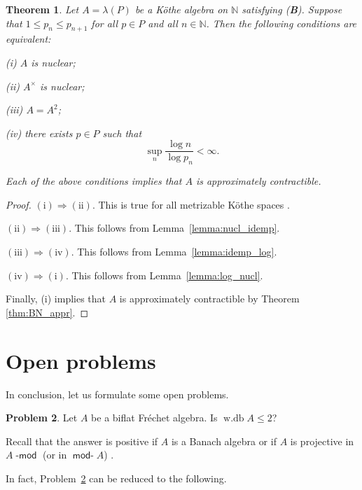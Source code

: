 \documentclass[12pt,reqno]{amsart}
\newtheorem{theorem}{Theorem}[section]
\theoremstyle{definition}
\newtheorem{problem}[theorem]{Problem}
\begin{document}
\begin{theorem}
\label{thm:idemp_appr}
Let $A=\lambda(P)$ be a K\"othe algebra on ${\mathbb N}$ satisfying {\upshape ({\textbf{B}})}.
Suppose that $1\le p_n\le p_{n+1}$ for all $p\in P$ and all $n\in{\mathbb N}$.
Then the following conditions are equivalent:
\begin{compactenum}
\item[{\upshape (i)}] $A$ is nuclear;
\item[{\upshape (ii)}] $A^\times$ is nuclear;
\item[{\upshape (iii)}] $A=A^2$;
\item[{\upshape (iv)}] there exists $p\in P$ such that
\[
\sup_n \frac{\log n}{\log p_n}<\infty.
\]
\end{compactenum}
Each of the above conditions implies that $A$ is approximately contractible.
\end{theorem}
\begin{proof}
$\mathrm{(i)}\Longrightarrow\mathrm{(ii)}$.
This is true for all metrizable K\"othe spaces \cite[Satz 7]{Kothe_nucl}.

$\mathrm{(ii)}\Longrightarrow\mathrm{(iii)}$. This follows from
Lemma~\ref{lemma:nucl_idemp}.

$\mathrm{(iii)}\Longrightarrow\mathrm{(iv)}$. This follows from
Lemma~\ref{lemma:idemp_log}.

$\mathrm{(iv)}\Longrightarrow\mathrm{(i)}$. This follows from
Lemma~\ref{lemma:log_nucl}.

Finally, (i) implies that $A$ is approximately contractible by Theorem \ref{thm:BN_appr}.
\end{proof}

\section{Open problems}
In conclusion, let us formulate some open problems.

\begin{problem}
\label{probl:bifl_wdb}
Let $A$ be a biflat Fr\'echet algebra. Is ${\mathop{\mathrm{w.db}}} A\le 2$?
\end{problem}

Recall that the answer is positive if $A$ is a Banach algebra
\cite[2.5.8]{X_HOA} or if $A$ is projective in $A{\mbox{-}\!\mathop{\mathsf{mod}}}$ (or in ${\mathop{\mathsf{mod}}\!\mbox{-}} A$)
\cite[Proposition 4.8]{Pir_msb}.

In fact, Problem~\ref{probl:bifl_wdb} can be reduced to the following.
\end{document}
